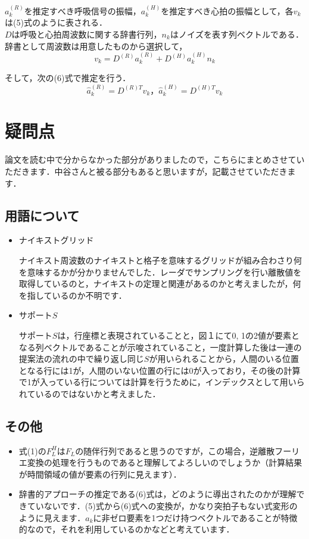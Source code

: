\documentclass[dvipdfmx]{jsarticle}
\begin{document}
$a_k^(R)を推定すべき呼吸信号の振幅，a_k^(H)を推定すべき心拍の振幅$として，各$v_k$は(5)式のように表される．$Dは呼吸と心拍周波数に関する辞書行列，n_kはノイズを表す列ベクトルである．$
辞書として周波数は用意したものから選択して，
\begin{equation}\label{}
v_k = D^(R) a_k^{(R)} + D^(H) a_k^{(H)} n_k
\end{equation}

そして，次の(6)式で推定を行う．
\begin{equation}\label{}
\hat{a}_k^{(R)} = D^{(R)T} v_k，\hat{a}_k^{(H)} = D^{(H)T} v_k
\end{equation}

\section{疑問点}
論文を読む中で分からなかった部分がありましたので，こちらにまとめさせていただきます．中谷さんと被る部分もあると思いますが，記載させていただきます．

\subsection{用語について}
\begin{itemize}
    \item ナイキストグリッド

    ナイキスト周波数のナイキストと格子を意味するグリッドが組み合わさり何を意味するかが分かりませんでした．レーダでサンプリングを行い離散値を取得しているのと，ナイキストの定理と関連があるのかと考えましたが，何を指しているのか不明です．

    \item サポート$\textit{S}$

サポート$\textit{S}$は，行座標と表現されていることと，図１にて0, 1の2値が要素となる列ベクトルであることが示唆されていること，一度計算した後は一連の提案法の流れの中で繰り返し同じ$\textit{S}$が用いられることから，人間のいる位置となる行には1が，人間のいない位置の行には0が入っており，その後の計算で1が入っている行については計算を行うために，インデックスとして用いられているのではないかと考えました．
\end{itemize}

\subsection{その他}
\begin{itemize}
    \item 式(1)の$F_L^H$は$F_L$の随伴行列であると思うのですが，この場合，逆離散フーリエ変換の処理を行うものであると理解してよろしいのでしょうか（計算結果が時間領域の値が要素の行列に見えます）．
    \item 辞書的アプローチの推定である(6)式は，どのように導出されたのかが理解できていないです．(5)式から(6)式への変換が，かなり突拍子もない式変形のように見えます．$a_k$に非ゼロ要素を1つだけ持つベクトルであることが特徴的なので，それを利用しているのかなどと考えています．
\end{itemize}
\end{document}
